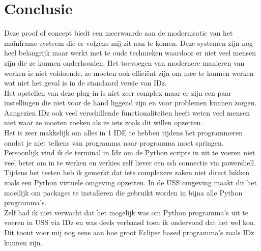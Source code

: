 
\chapter{Conclusie}%
\label{ch:conclusie}


Deze proof of concept biedt een meerwaarde aan de modernisatie van het mainframe systeem die er volgens mij zit aan te komen. Deze systemen zijn nog heel belangrijk maar werkt met te oude technieken waardoor er niet veel mensen zijn die ze kunnen onderhouden. Het toevoegen van modernere manieren van werken is niet voldoende, ze moeten ook efficiënt zijn om mee te kunnen werken wat niet het geval is in de standaard versie van IDz. \\

Het opstellen van deze plug-in is niet zeer complex maar er zijn een paar instellingen die niet voor de hand liggend zijn en voor problemen kunnen zorgen. Aangezien IDz ook veel verschillende functionaliteiten heeft weten veel mensen niet waar ze moeten zoeken als ze iets zoals dit willen opzetten. \\

Het is zeer makkelijk om alles in 1 IDE te hebben tijdens het programmeren omdat je niet telkens van programma naar programma moet springen. Persoonlijk vind ik de terminal in Idz om de Python scripts in uit te voeren niet veel beter om in te werken en verkies zelf liever een ssh connectie via powershell. 
Tijdens het testen heb ik gemerkt dat iets complexere zaken niet direct lukken zoals een Python virtuele omgeving opzetten. In de USS omgeving maakt dit het moeilijk om packages te installeren die gebruikt worden in bijna alle Python programma's. \\

Zelf had ik niet verwacht dat het mogelijk was om Python programma's uit te voeren in USS via IDz en was deels verbaasd toen ik ondervond dat het wel kon. Dit toont voor mij nog eens aan hoe groot Eclipse based programma's zoals IDz kunnen zijn. 

